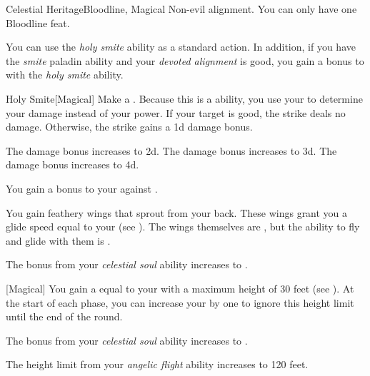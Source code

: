     \begin{feat}{Celestial Heritage}{Bloodline, Magical}
        \featpre Non-evil alignment.
         You can only have one Bloodline feat.

         You can use the \textit{holy smite} ability as a standard action.
        In addition, if you have the \textit{smite} paladin ability and your \textit{devoted alignment} is good, you gain a  bonus to  with the \textit{holy smite} ability.
        \begin{freeability}{Holy Smite}[Magical]
            Make a .
            Because this is a  ability, you use your   to determine your damage instead of your  power.
            If your target is good, the strike deals no damage.
            Otherwise, the strike gains a \plus1d damage bonus.

            \rankline
             The damage bonus increases to \plus2d.
             The damage bonus increases to \plus3d.
             The damage bonus increases to \plus4d.
        \end{freeability}

         You gain a  bonus to your  against .

         You gain feathery wings that sprout from your back.
        These wings grant you a glide speed equal to your  (see ).
        The wings themselves are , but the ability to fly and glide with them is .

         The bonus from your \textit{celestial soul} ability increases to .

        [Magical] You gain a  equal to your  with a maximum height of 30 feet (see ).
        At the start of each phase, you can increase your  by one to ignore this height limit until the end of the round.

         The bonus from your \textit{celestial soul} ability increases to .

         The height limit from your \textit{angelic flight} ability increases to 120 feet.
    \end{feat}


